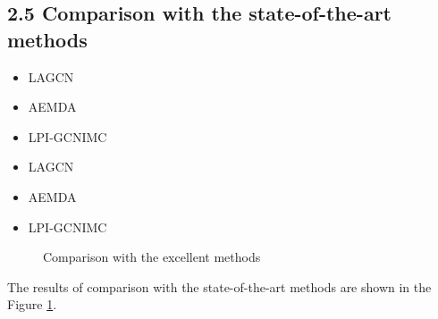\documentclass[fleqn,10pt]{wlscirep}
\begin{document}
\subsection*{2.5 Comparison with the state-of-the-art methods}

\begin{itemize}
\item LAGCN
\item AEMDA
\item LPI-GCNIMC
\end{itemize}

\begin{itemize}
\item LAGCN
\item AEMDA
\item LPI-GCNIMC
\end{itemize}

\begin{figure}[ht]
\centering
{}
\caption{Comparison with the excellent methods}
\label{Fig.lable3}
\end{figure}

The results of comparison with the state-of-the-art methods are shown in the Figure \ref{Fig.lable3}.
\end{document}

